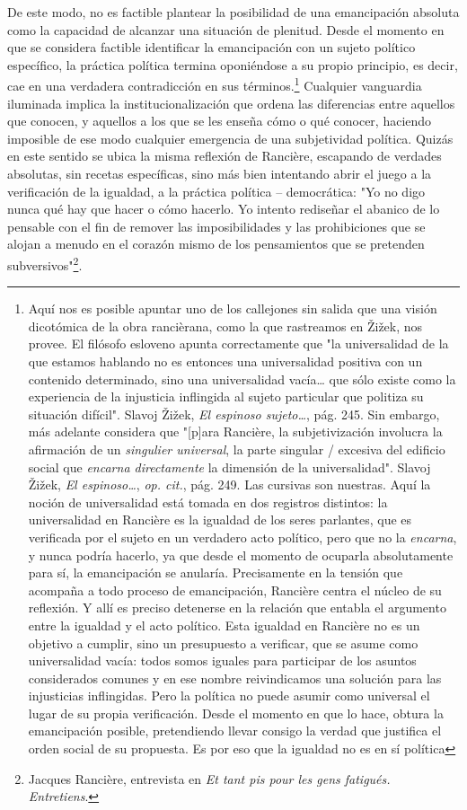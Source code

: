 \documentclass{book}
\begin{document}
De este modo, no es factible plantear la posibilidad de una emancipación
absoluta como la capacidad de alcanzar una situación de plenitud. Desde
el momento en que se considera factible identificar la emancipación con
un sujeto político específico, la práctica política termina oponiéndose
a su propio principio, es decir, cae en una verdadera contradicción en
sus términos.\footnote{Aquí nos es posible apuntar uno de los callejones
  sin salida que una visión dicotómica de la obra rancièrana, como la
  que rastreamos en Žižek, nos provee. El filósofo esloveno apunta
  correctamente que "la universalidad de la que estamos hablando no es
  entonces una universalidad positiva con un contenido determinado, sino
  una universalidad vacía\ldots{} que sólo existe como la experiencia de
  la injusticia inflingida al sujeto particular que politiza su
  situación difícil". Slavoj Žižek, \emph{El espinoso sujeto\ldots{}},
  pág. 245. Sin embargo, más adelante considera que "{[}p{]}ara
  Rancière, la subjetivización involucra la afirmación de un
  \emph{singulier universal}, la parte singular / excesiva del edificio
  social que \emph{encarna directamente} la dimensión de la
  universalidad". Slavoj Žižek, \emph{El espinoso\ldots{}}, \emph{op.
  cit.}, pág. 249. Las cursivas son nuestras. Aquí la noción de
  universalidad está tomada en dos registros distintos: la universalidad
  en Rancière es la igualdad de los seres parlantes, que es verificada
  por el sujeto en un verdadero acto político, pero que no la
  \emph{encarna}, y nunca podría hacerlo, ya que desde el momento de
  ocuparla absolutamente para sí, la emancipación se anularía.
  Precisamente en la tensión que acompaña a todo proceso de
  emancipación, Rancière centra el núcleo de su reflexión. Y allí es
  preciso detenerse en la relación que entabla el argumento entre la
  igualdad y el acto político. Esta igualdad en Rancière no es un
  objetivo a cumplir, sino un presupuesto a verificar, que se asume como
  universalidad vacía: todos somos iguales para participar de los
  asuntos considerados comunes y en ese nombre reivindicamos una
  solución para las injusticias inflingidas. Pero la política no puede
  asumir como universal el lugar de su propia verificación. Desde el
  momento en que lo hace, obtura la emancipación posible, pretendiendo
  llevar consigo la verdad que justifica el orden social de su
  propuesta. Es por eso que la igualdad no es en sí política} Cualquier
vanguardia iluminada implica la institucionalización que ordena las
diferencias entre aquellos que conocen, y aquellos a los que se les
enseña cómo o qué conocer, haciendo imposible de ese modo cualquier
emergencia de una subjetividad política. Quizás en este sentido se ubica
la misma reflexión de Rancière, escapando de verdades absolutas, sin
recetas específicas, sino más bien intentando abrir el juego a la
verificación de la igualdad, a la práctica política -- democrática: "Yo
no digo nunca qué hay que hacer o cómo hacerlo. Yo intento rediseñar el
abanico de lo pensable con el fin de remover las imposibilidades y las
prohibiciones que se alojan a menudo en el corazón mismo de los
pensamientos que se pretenden subversivos"\footnote{Jacques Rancière,
  entrevista en \emph{Et tant pis pour les gens fatigués. Entretiens}.}.
\end{document}
